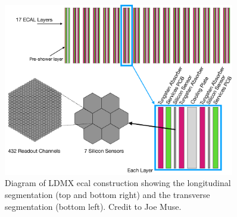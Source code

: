 \begin{figure}
    \centering
    \includegraphics[width=0.9\textwidth]{figures/ldmx/experiment/ecal.pdf}
    \caption{
        Diagram of LDMX \gls{ecal} construction showing the longitudinal segmentation
        (top and bottom right) and the transverse segmentation (bottom left).
        Credit to Joe Muse.
    }
    \label{fig:ldmx-ecal}
\end{figure}
